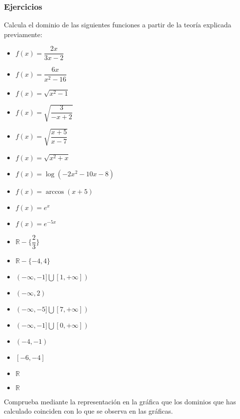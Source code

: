 \subsubsection{Ejercicios}
\begin{ex}
	Calcula el dominio de las siguientes funciones a partir de la teoría explicada previamente:\\
	\begin{itemize}
		\item $f(x) = \dfrac{2x}{3x-2}$
		\item $f(x) = \dfrac{6x}{x^2-16}$
		\item $f(x) = \sqrt{x^2-1}$
		\item $f(x) = \sqrt{\dfrac{3}{-x+2}}$
		\item $f(x) = \sqrt{\dfrac{x+5}{x-7}}$
		\item $f(x) = \sqrt{x^2+x}$
		\item $f(x) = \log(-2x^2-10x-8)$
		\item $f(x) = \arccos(x+5)$
		\item $f(x) = e^x$
		\item $f(x) = e^{-5x}$
	\end{itemize}
	\begin{sol}
		\begin{itemize}
			\item $\mathbb{R}-\{\dfrac{2}{3}\}$
			\item $\mathbb{R}-\{-4, 4\}$
			\item $(-\infty, -1]\bigcup [1, +\infty])$
			\item $(-\infty, 2)$
			\item $(-\infty, -5]\bigcup [7, +\infty])$
			\item $(-\infty, -1]\bigcup [0, +\infty])$
			\item $(-4,-1)$
			\item $[-6, -4]$
			\item $\mathbb{R}$
			\item $\mathbb{R}$
		\end{itemize}
	\end{sol}
\end{ex}

\vspace{1cm}

\begin{ex}
	Comprueba mediante la representación en la gráfica que los dominios que has calculado coinciden con lo que se observa en las gráficas.
	\begin{sol}
	\end{sol}
\end{ex}

\vspace{1cm}